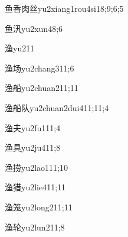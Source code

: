 \begin{verbete}{鱼香肉丝}{yu2xiang1rou4si1}{8;9;6;5}
\end{verbete}

\begin{verbete}{鱼汛}{yu2xun4}{8;6}
\end{verbete}

\begin{verbete}{渔}{yu2}{11}
\end{verbete}

\begin{verbete}{渔场}{yu2chang3}{11;6}
\end{verbete}

\begin{verbete}{渔船}{yu2chuan2}{11;11}
\end{verbete}

\begin{verbete}{渔船队}{yu2chuan2dui4}{11;11;4}
\end{verbete}

\begin{verbete}{渔夫}{yu2fu1}{11;4}
\end{verbete}

\begin{verbete}{渔具}{yu2ju4}{11;8}
\end{verbete}

\begin{verbete}{渔捞}{yu2lao1}{11;10}
\end{verbete}

\begin{verbete}{渔猎}{yu2lie4}{11;11}
\end{verbete}

\begin{verbete}{渔笼}{yu2long2}{11;11}
\end{verbete}

\begin{verbete}{渔轮}{yu2lun2}{11;8}
\end{verbete}

